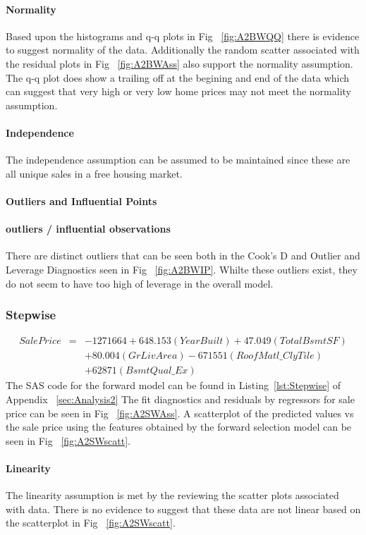 \documentclass[11pt]{scrartcl} %
\begin{document}
\paragraph{Normality} Based upon the histograms and q-q plots in Fig ~\ref{fig:A2BWQQ} there is evidence to suggest normality of the data. Additionally the random scatter associated with the residual plots in Fig ~\ref{fig:A2BWAss} also support the normality assumption. The q-q plot does show a trailing off at the begining and end of the data which can suggest that very high or very low home prices may not meet the normality assumption.
\paragraph{Independence} The independence assumption can be assumed to be maintained since these are all unique sales in a free housing market. 
\paragraph{Outliers and Influential Points}
\paragraph{outliers / influential observations} There are distinct outliers that can be seen both in the Cook's D and Outlier and Leverage Diagnostics seen in Fig ~\ref{fig:A2BWIP}. Whilte these outliers exist, they do not seem to have too high of leverage in the overall model.

\subsubsection{Stepwise}
\begin{eqnarray*}
SalePrice &=& -1271664 + 648.153(YearBuilt) + 47.049(TotalBsmtSF) \\
& & + 80.004(GrLivArea) - 671551(RoofMatl\_ClyTile)\\
& & + 62871(BsmtQual\_Ex)
\end{eqnarray*}
The SAS code for the forward model can be found in Listing~\ref{lst:Stepwise} of Appendix ~\ref{sec:Analysis2}
The fit diagnostics and residuals by regressors for sale price can be seen in Fig ~\ref{fig:A2SWAss}. A scatterplot of the predicted values vs the sale price using the features obtained by the forward selection model can be seen in Fig ~\ref{fig:A2SWscatt}.
\paragraph{Linearity} The linearity assumption is met by the reviewing the scatter plots associated with data. There is no evidence to suggest that these data are not linear based on the scatterplot in Fig ~\ref{fig:A2SWscatt}.
\end{document}
